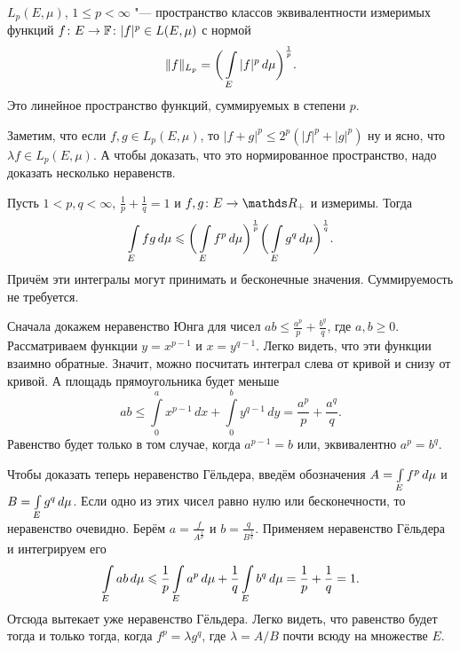 \begin{Def}
  $L_p(E,\mu)$, $1\le p<\infty$ "--- пространство классов эквивалентности измеримых функций $f\colon E\rightarrow \mathbb F\colon |f|^p\in L(E,\mu)$ с нормой 
\[
  \|f\|_{L_p} = \bigg(\int\limits_{E}|f|^p\,d\mu\bigg)^{\frac1p}.
\]
Это линейное пространство функций, суммируемых в степени $p$.
\end{Def}

Заметим, что если $f,g\in L_p(E,\mu)$, то $|f+g|^p\le 2^p (|f|^p+|g|^p)$ ну и ясно, что $\lambda f\in L_p(E,\mu)$. А чтобы доказать, что это нормированное пространство, надо доказать несколько неравенств.
\begin{Ut}\label{Gulder}
  Пусть $1<p,q<\infty$, $\frac1p+\frac1q=1$ и $f,g\colon E\to\R_+$ и измеримы. Тогда
\[
  \int\limits_{E}fg\,d\mu\leqslant \bigg(\int\limits_{E}f^p\,d\mu\bigg)^{\frac1p}\bigg(\int\limits_{E}g^q\,d\mu\bigg)^{\frac1q}.
\]
Причём эти интегралы могут принимать и бесконечные значения. Суммируемость не требуется.
\end{Ut}
\begin{Proof}
  Сначала докажем неравенство Юнга для чисел $ab\le \frac{a^p}p + \frac{b^q}q$, где $a,b\ge0$. Рассматриваем функции $y = x^{p-1}$ и $x = y^{q-1}$. Легко видеть, что эти функции взаимно обратные. Значит, можно посчитать интеграл слева от кривой и снизу от кривой. А площадь прямоугольника будет меньше
\[
  ab\le \int\limits_0^a x^{p-1}\,dx + \int\limits_0^b y^{q-1}\,dy = \frac{a^p}p+\frac{a^q}q.
\]
Равенство будет только в том случае, когда $a^{p-1} = b$ или, эквивалентно $a^p = b^q$.

Чтобы доказать теперь неравенство Гёльдера, введём обозначения $A = \int\limits_{E}f^p\,d\mu$ и $B=\int\limits_{E}g^q\,d\mu$. Если одно из этих чисел равно нулю или бесконечности, то неравенство очевидно. Берём $a = \frac f{A^{\frac1p}}$ и $b = \frac q{B^{\frac1q}}$. Применяем неравенство Гёльдера и интегрируем его
\[
  \int\limits_{E}ab\,d\mu\leqslant \frac1p\int\limits_{E}a^p\,d\mu+\frac1q\int\limits_{E}b^q\,d\mu = \frac1p+\frac1q=1.
\]
Отсюда вытекает уже неравенство Гёльдера. Легко видеть, что равенство будет тогда и только тогда, когда $f^p = \lambda g^q$, где $\lambda = A/B$ почти всюду на множестве $E$.
\end{Proof}

